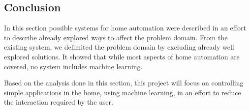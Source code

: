 \subsection{Conclusion}
In this section possible systems for home automation were described in an effort to describe already explored ways to affect the problem domain. From the existing system, we delimited the problem domain by excluding already well explored solutions. It showed that while most aspects of home automation are covered, no system includes machine learning.

Based on the analysis done in this section, this project will focus on controlling simple applications in the home, using machine learning, in an effort to reduce the interaction required by the user.
